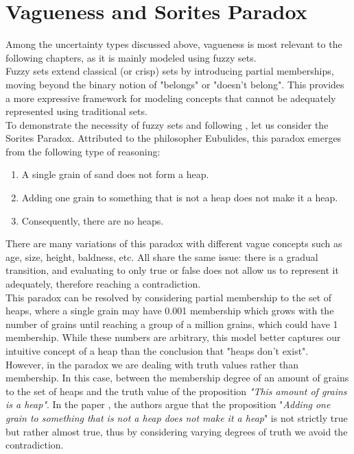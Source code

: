 \section{Vagueness and Sorites Paradox}

Among the uncertainty types discussed above, vagueness is most relevant to the following chapters, as it is mainly modeled using fuzzy sets.\\

Fuzzy sets extend classical (or crisp) sets by introducing partial memberships, moving beyond the binary notion of "belongs" or "doesn't belong". This provides a more expressive framework for modeling concepts that cannot be adequately represented using traditional sets.\\

To demonstrate the necessity of fuzzy sets and following \cite{HájekSorites}, let us consider the Sorites Paradox. Attributed to the philosopher Eubulides, this paradox emerges from the following type of reasoning:

\begin{enumerate}
    \item A single grain of sand does not form a heap.
    \item Adding one grain to something that is not a heap does not make it a heap.
    \item Consequently, there are no heaps.
\end{enumerate}


There are many variations of this paradox with different vague concepts such as age, size, height, baldness, etc. All share the same issue: there is a gradual transition, and evaluating to only true or false does not allow us to represent it adequately, therefore reaching a contradiction.\\

This paradox can be resolved by considering partial membership to the set of heaps, where a single grain may have 0.001 membership which grows with the number of grains until reaching a group of a million grains, which could have 1 membership. While these numbers are arbitrary, this model better captures our intuitive concept of a heap than the conclusion that "heaps don't exist".\\

However, in the paradox we are dealing with truth values rather than membership. In this case,  between the membership degree of an amount of grains to the set of heaps and the truth value of the proposition \textit{"This amount of grains is a heap"}. In the paper \cite{HájekSorites}, the authors argue that the proposition "\textit{Adding one grain to something that is not a heap does not make it a heap}" is not strictly true but rather almost true, thus by considering varying degrees of truth we avoid the contradiction.\\

